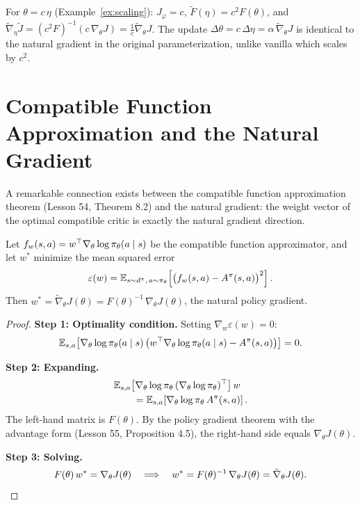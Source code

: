 \documentclass[11pt,a4paper]{article}
\begin{document}
\begin{example}
\label{ex:covariance-scaling}
For $\theta = c\,\eta$ (Example~\ref{ex:scaling}): $J_\varphi = c$,
$\tilde{F}(\eta) = c^2 F(\theta)$, and $\tilde{\nabla}_\eta \tilde{J}
= (c^2 F)^{-1} (c\, \nabla_\theta J) = \frac{1}{c}
\tilde{\nabla}_\theta J$. The update $\Delta\theta = c\, \Delta\eta
= \alpha\, \tilde{\nabla}_\theta J$ is identical to the natural gradient
in the original parameterization, unlike vanilla which scales by $c^2$.
\end{example}

\section{Compatible Function Approximation and the Natural Gradient}

A remarkable connection exists between the compatible function
approximation theorem (Lesson 54, Theorem 8.2) and the natural
gradient: the weight vector of the optimal compatible critic is
exactly the natural gradient direction.

\begin{theorem}
\label{thm:natural-compatible}
Let $f_w(s,a) = w^\top \nabla_\theta \log \pi_\theta(a \mid s)$ be
the compatible function approximator, and let $w^*$ minimize the
mean squared error
\[
  \varepsilon(w) = \mathbb{E}_{s \sim d^\pi,\, a \sim \pi_\theta}\!\left[
    \bigl(f_w(s,a) - A^{\pi}(s,a)\bigr)^2\right].
\]
Then $w^* = \tilde{\nabla}_\theta J(\theta) = F(\theta)^{-1}\,
\nabla_\theta J(\theta)$, the natural policy gradient.
\end{theorem}

\begin{proof}
\textbf{Step 1: Optimality condition.}
Setting $\nabla_w \varepsilon(w) = 0$:
\[
  \mathbb{E}_{s,a}\!\left[\nabla_\theta \log \pi_\theta(a \mid s)\,
  \bigl(w^\top \nabla_\theta \log \pi_\theta(a \mid s)
  - A^\pi(s,a)\bigr)\right] = 0.
\]

\textbf{Step 2: Expanding.}
\begin{align*}
  &\mathbb{E}_{s,a}\!\left[\nabla_\theta \log \pi_\theta\,
    (\nabla_\theta \log \pi_\theta)^\top\right] w \\
  &\qquad = \mathbb{E}_{s,a}\!\left[\nabla_\theta \log \pi_\theta\,
    A^\pi(s,a)\right].
\end{align*}
The left-hand matrix is $F(\theta)$. By the policy gradient theorem
with the advantage form (Lesson 55, Proposition 4.5), the right-hand
side equals $\nabla_\theta J(\theta)$.

\textbf{Step 3: Solving.}
\[
  F(\theta)\, w^* = \nabla_\theta J(\theta)
  \quad \Longrightarrow \quad
  w^* = F(\theta)^{-1}\, \nabla_\theta J(\theta)
  = \tilde{\nabla}_\theta J(\theta). \qedhere
\]
\end{proof}
\end{document}
